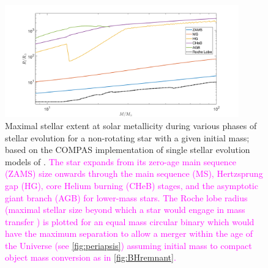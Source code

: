 \documentclass[iop,onecolumn]{revtex4}
\newcommand{\todo}[1]{\textcolor{red}{#1}}
\newcommand{\ilya}[1]{\textcolor{magenta}{#1}}
\begin{document}
\begin{figure}
	\centering	
	\includegraphics[width=0.9\textwidth]{StellarRadiusZsolarRoche.png}
\caption{Maximal stellar extent at solar metallicity during various phases of stellar evolution for a non-rotating star with a given initial mass; based on the COMPAS implementation of single stellar evolution models of \citet{Hurley:2000}.   \ilya{The star expands from its zero-age main sequence (ZAMS) size onwards through the main sequence (MS), Hertzsprung gap (HG), core Helium burning (CHeB) stages, and the asymptotic giant branch (AGB) for lower-mass stars.  The Roche lobe radius (maximal stellar size beyond which a star would engage in mass transfer \citep{Eggleton:1983}) is plotted for an equal mass circular binary which would have the maximum separation to allow a merger within the age of the Universe (see \autoref{fig:periapsis}) assuming initial mass to compact object mass conversion as in \autoref{fig:BHremnant}.}\label{fig:Rmax} }
\end{figure}

\end{document}
